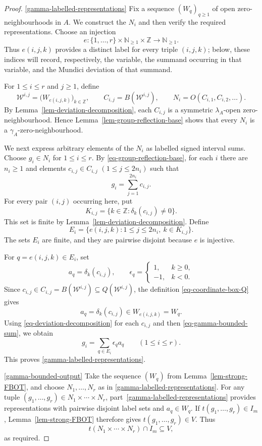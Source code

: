 \documentclass[preprint,3p]{elsarticle}
\theoremstyle{plain}
\theoremstyle{definition}
\numberwithin{equation}{section}
\begin{document}
\begin{proof}
\ref{gamma-labelled-representations}
Fix a sequence $(W_q)_{q\geq1}$ of open zero-neighbourhoods in $A$.
We construct the $N_i$ and then verify the required representations.
Choose an injection
\[
 e\colon\{1,\ldots,r\}\times\mathbb N_{\geq1}\times\mathbb Z
 \longrightarrow\mathbb N_{\geq1}.
\]
Thus $e(i,j,k)$ provides a distinct label for every triple $(i,j,k)$;
below, these indices will record, respectively, the variable, the summand
occurring in that variable, and the Mundici deviation of that summand.

For $1\leq i\leq r$ and $j\geq1$, define
\[
 \mathcal W^{i,j}
 =\bigl(W_{e(i,j,k)}\bigr)_{k\in\mathbb Z},\qquad
 C_{i,j}=B(\mathcal W^{i,j}),\qquad
 N_i=O(C_{i,1},C_{i,2},\ldots).
\]
By Lemma~\ref{lem-deviation-decomposition}, each $C_{i,j}$ is a
symmetric $\lambda_A$-open zero-neighbourhood.  Hence
Lemma~\ref{lem-group-reflection-base} shows that every $N_i$ is a
$\gamma_A$-zero-neighbourhood.

We next express arbitrary elements of the $N_i$ as labelled
signed interval sums.  Choose
$g_i\in N_i$ for $1\leq i\leq r$.  By
\eqref{eq-group-reflection-base}, for each $i$ there are $n_i\geq1$ and
elements $c_{i,j}\in C_{i,j}$ $(1\leq j\leq2n_i)$ such that
\begin{equation}
\label{eq-gamma-bounded-sum}
 g_i=\sum_{j=1}^{2n_i}c_{i,j}.
\end{equation}
For every pair $(i,j)$ occurring here, put
\[
 K_{i,j}=\{k\in\mathbb Z:\delta_k(c_{i,j})\neq0\}.
\]
This set is finite by Lemma~\ref{lem-deviation-decomposition}.  Define
\[
 E_i
 =\{e(i,j,k):1\leq j\leq2n_i,\ k\in K_{i,j}\}.
\]
The sets $E_i$ are finite, and they are pairwise disjoint because
$e$ is injective.

For $q=e(i,j,k)\in E_i$, set
\[
 a_q=\delta_k(c_{i,j}),
 \qquad
 \epsilon_q=
 \begin{cases}
  1,&k\geq0,\\
  -1,&k<0.
 \end{cases}
\]
Since
$c_{i,j}\in C_{i,j}=B(\mathcal W^{i,j})\subseteq
Q(\mathcal W^{i,j})$, the definition
\eqref{eq-coordinate-box-Q} gives
\[
 a_q=\delta_k(c_{i,j})
 \in W_{e(i,j,k)}=W_q.
\]
Using \eqref{eq-deviation-decomposition} for each $c_{i,j}$ and then
\eqref{eq-gamma-bounded-sum}, we obtain
\[
 g_i=\sum_{q\in E_i}\epsilon_q a_q
 \qquad(1\leq i\leq r).
\]
This proves \ref{gamma-labelled-representations}.

\ref{gamma-bounded-output}
Take the sequence $(W_q)$ from Lemma~\ref{lem-strong-FBOT}, and choose
$N_1,\ldots,N_r$ as in \ref{gamma-labelled-representations}.
For any tuple $(g_1,\ldots,g_r)\in N_1\times\cdots\times N_r$,
part~\ref{gamma-labelled-representations} provides representations
with pairwise disjoint label sets and $a_q\in W_q$.
If $t(g_1,\ldots,g_r)\in I_m$, Lemma~\ref{lem-strong-FBOT}
therefore gives $t(g_1,\ldots,g_r)\in V$.  Thus
\[
 t(N_1\times\cdots\times N_r)\cap I_m\subseteq V,
\]
as required.
\end{proof}
\end{document}
